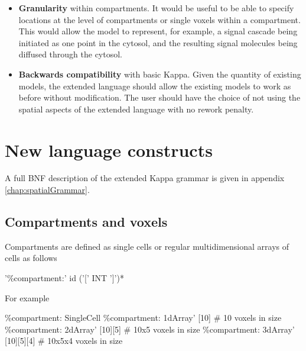\begin{itemize}
 \item \textbf{Granularity} within compartments. It would be useful to be able to specify locations at the level of compartments or single voxels within a compartment. This would allow the model to represent, for example, a signal cascade being initiated as one point in the cytosol, and the resulting signal molecules being diffused through the cytosol. 

 \item \textbf{Backwards compatibility} with basic Kappa. Given the quantity of existing models, the extended language should allow the existing models to work as before without modification. The user should have the choice of not using the spatial aspects of the extended language with no rework penalty.

\end{itemize}


\section{New language constructs}

A full BNF description of the extended Kappa grammar is given in appendix \ref{chap:spatialGrammar}.

\subsection{Compartments and voxels}

Compartments are defined as single cells or regular multidimensional arrays of cells as follows
\begin{bnfsource}
'\%compartment:' id ('[' INT ']')*
\end{bnfsource}
For example
\begin{kappasource}
\%compartment: SingleCell 
\%compartment: 1dArray' [10]       # 10 voxels in size 
\%compartment: 2dArray' [10][5]    # 10x5 voxels in size 
\%compartment: 3dArray' [10][5][4] # 10x5x4 voxels in size 
\end{kappasource}

